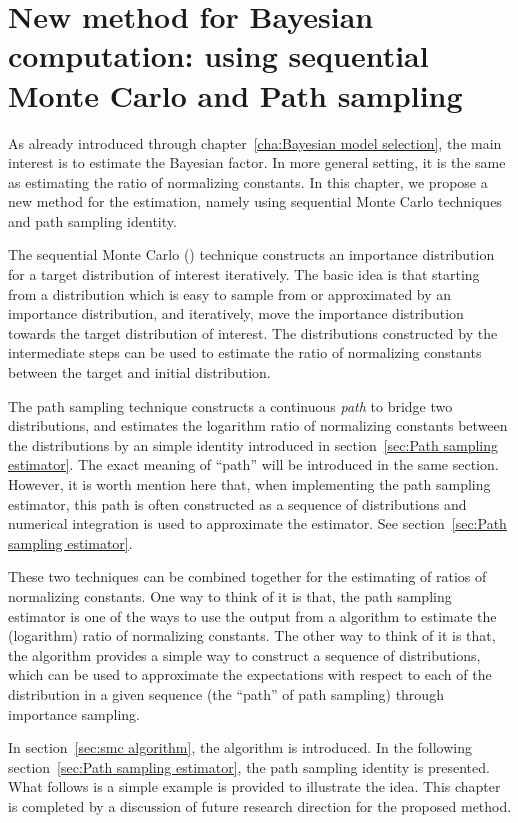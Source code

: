 \chapter{New method for Bayesian computation: using sequential Monte Carlo and
  Path sampling}
\label{cha:New method for Bayesian computation}

As already introduced through chapter~\ref{cha:Bayesian model selection}, the
main interest is to estimate the Bayesian factor. In more general setting, it
is the same as estimating the ratio of normalizing constants. In this chapter,
we propose a new method for the estimation, namely using sequential Monte
Carlo techniques and path sampling identity.

The sequential Monte Carlo (\smc) technique constructs an importance
distribution for a target distribution of interest iteratively. The basic idea
is that starting from a distribution which is easy to sample from or
approximated by an importance distribution, and iteratively, move the
importance distribution towards the target distribution of interest. The
distributions constructed by the intermediate steps can be used to estimate
the ratio of normalizing constants between the target and initial
distribution. \parencite{DelMoral2006}

The path sampling technique constructs a continuous \emph{path} to bridge two
distributions, and estimates the logarithm ratio of normalizing constants
between the distributions by an simple identity introduced in
section~\ref{sec:Path sampling estimator}. The exact meaning of ``path'' will
be introduced in the same section. However, it is worth mention here that,
when implementing the path sampling estimator, this path is often constructed
as a sequence of distributions and numerical integration is used to
approximate the estimator. See section~\ref{sec:Path sampling estimator}.
\parencite{Gelman1998}

These two techniques can be combined together for the estimating of ratios of
normalizing constants. One way to think of it is that, the path sampling
estimator is one of the ways to use the output from a \smc algorithm to
estimate the (logarithm) ratio of normalizing constants. The other way to
think of it is that, the \smc algorithm provides a simple way to construct a
sequence of distributions, which can be used to approximate the expectations
with respect to each of the distribution in a given sequence (the ``path'' of
path sampling) through importance sampling.

In section~\ref{sec:smc algorithm}, the \smc algorithm is introduced. In the
following section~\ref{sec:Path sampling estimator}, the path sampling
identity is presented. What follows is a simple example is provided to
illustrate the idea. This chapter is completed by a discussion of future
research direction for the proposed method.

